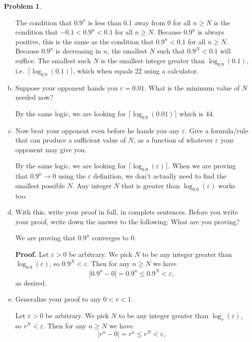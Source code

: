 \documentclass[11pt,oneside]{amsart}
\theoremstyle{definition}
\newtheorem{problem}{Problem}
\theoremstyle{plain}
\newcommand{\eps}{\varepsilon}
\begin{document}
\begin{problem}
\begin{enumerate}[(a)]
\begin{solution}
                The condition that $0.9^n$ is less than 0.1 away from 0 for all $n\geq N$ is the condition that $-0.1<0.9^n<0.1$ for all $n\geq N$. Because $0.9^n$ is always positive, this is the same as the condition that $0.9^n<0.1$ for all $n\geq N$. Because $0.9^n$ is decreasing in $n$, the smallest $N$ such that $0.9^N<0.1$ will suffice. The smallest such $N$ is the smallest integer greater than $\log_{0.9}(0.1)$, i.e.\ $\lceil \log_{0.9}(0.1)\rceil$, which when equals 22 using a calculator.
            \end{solution}
            \item Suppose your opponent hands you $\eps=0.01$. What is the minimum value of $N$ needed now?
            \begin{solution}
                By the same logic, we are looking for $\lceil \log_{0.9}(0.01)\rceil$ which is 44.
            \end{solution}
            \item Now beat your opponent even before he hands you any $\eps$. Give a formula/rule that can produce a sufficient value of $N$, as a function of whatever $\eps$ your opponent may give you.
            \begin{solution}
                By the same logic, we are looking for $\lceil \log_{0.9}(\eps)\rceil$. When we are proving that $0.9^n\to 0$ using the $\eps$ definition, we don't actually need to find the smallest possible $N$. Any integer $N$ that is greater than $\log_{0.9}(\eps)$ works too.
            \end{solution}
            \item With this, write your proof in full, in complete sentences. Before you write your proof, write down the answer to the following: What are you proving?
            \begin{solution}
                We are proving that $0.9^n$ converges to 0.

                \textbf{Proof.} Let $\eps>0$ be arbitrary. We pick $N$ to be any integer greater than $\log_{0.9}(\eps)$, so $0.9^N<\eps$. Then for any $n\geq N$ we have
                \[|0.9^n-0|=0.9^n\leq 0.9^N<\eps,\]
                as desired.
            \end{solution}
            \item Generalize your proof to any $0<r<1$.
            \begin{solution}
                Let $\eps>0$ be arbitrary. We pick $N$ to be any integer greater than $\log_{r}(\eps)$, so $r^N<\eps$. Then for any $n\geq N$ we have
                \[|r^n-0|=r^n\leq r^N<\eps,\]
            \end{solution}
        \end{enumerate}
    \end{problem}
\end{document}
